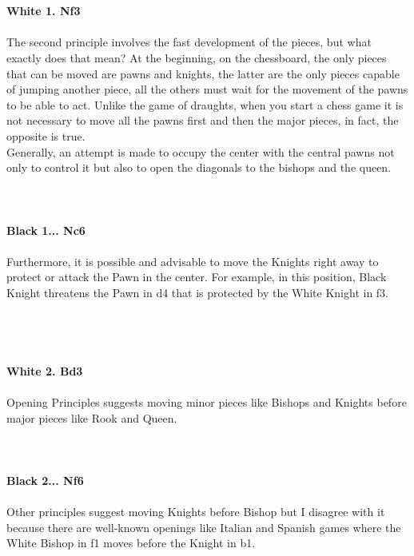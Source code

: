 \documentclass{article}
\begin{document}
\\
\\
\textbf{White 1. Nf3}\\
\\
The second principle involves the fast development of the pieces, but what exactly does that mean? At the beginning, on the chessboard, the only pieces that can be moved are pawns and knights, the latter are the only pieces capable of jumping another piece, all the others must wait for the movement of the pawns to be able to act. Unlike the game of draughts, when you start a chess game it is not necessary to move all the pawns first and then the major pieces, in fact, the opposite is true.\\Generally, an attempt is made to occupy the center with the central pawns not only to control it but also to open the diagonals to the bishops and the queen.\\
\\

\\
\\
\textbf{Black 1... Nc6}\\
\\
Furthermore, it is possible and advisable to move the Knights right away to protect or attack the Pawn in the center. For example, in this position, Black Knight threatens the Pawn in d4 that is protected by the White Knight in f3.\\\\
\\

\\
\\
\textbf{White 2. Bd3}\\
\\
Opening Principles suggests moving minor pieces like Bishops and Knights before major pieces like Rook and Queen.\\
\\

\\
\\
\textbf{Black 2... Nf6}\\
\\
Other principles suggest moving Knights before Bishop but I disagree with it because there are well-known openings like Italian and Spanish games where the White Bishop in f1 moves before the Knight in b1.\\
\end{document}

